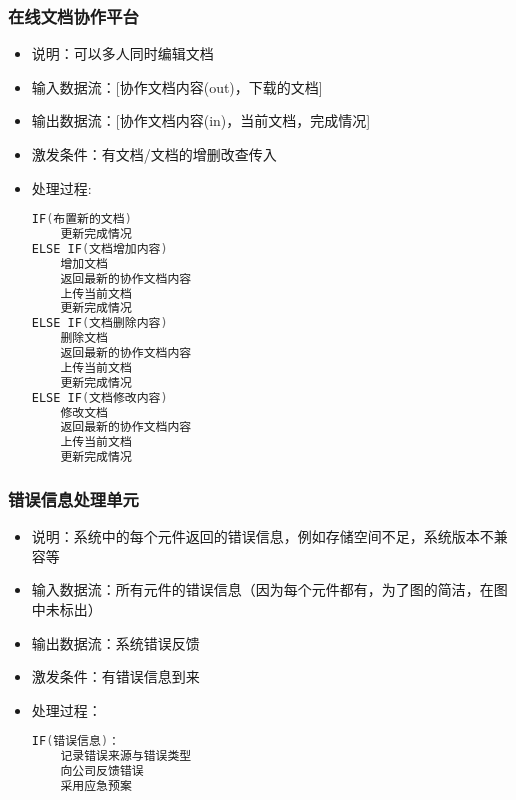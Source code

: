             \subsubsection{在线文档协作平台}
            \begin{itemize}
                \item 说明：可以多人同时编辑文档
                \item 输入数据流：[协作文档内容(out)，下载的文档]
                \item 输出数据流：[协作文档内容(in)，当前文档，完成情况]
                \item 激发条件：有文档/文档的增删改查传入
                \item 处理过程: 
\begin{lstlisting}[language=C, caption=在线文档协作平台, label={code:first-code}]
IF(布置新的文档)
    更新完成情况
ELSE IF(文档增加内容)
    增加文档
    返回最新的协作文档内容
    上传当前文档
    更新完成情况
ELSE IF(文档删除内容)
    删除文档
    返回最新的协作文档内容
    上传当前文档
    更新完成情况
ELSE IF(文档修改内容)
    修改文档
    返回最新的协作文档内容
    上传当前文档
    更新完成情况
\end{lstlisting}
            \end{itemize}
            \subsubsection{错误信息处理单元}
            \begin{itemize}
                \item 说明：系统中的每个元件返回的错误信息，例如存储空间不足，系统版本不兼容等
                \item 输入数据流：所有元件的错误信息（因为每个元件都有，为了图的简洁，在图中未标出）
                \item 输出数据流：系统错误反馈
                \item 激发条件：有错误信息到来
                \item 处理过程：
\begin{lstlisting}[language=C, caption=错误信息处理单元, label={code:first-code}]
IF(错误信息)：
    记录错误来源与错误类型
    向公司反馈错误
    采用应急预案
\end{lstlisting}
            \end{itemize}




